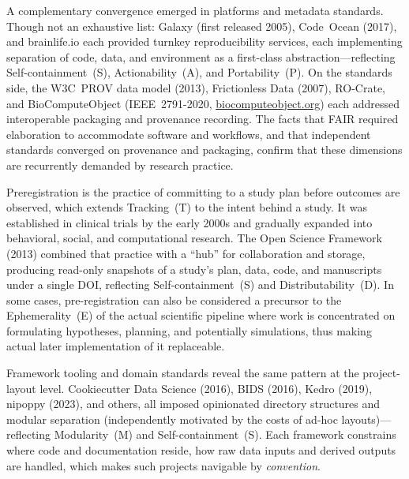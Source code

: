 \documentclass{article}
\newcommand{\httpsurl}[1]{\href{https://#1}{#1}}
\begin{document}
A complementary convergence emerged in platforms and metadata standards.
Though not an exhaustive list: Galaxy\cite{afgan_galaxy_2018} (first released 2005), Code~Ocean\cite{cheifet_promoting_2021} (2017), and brainlife.io\cite{hayashi_brainlifeio_2024} each provided turnkey reproducibility services, each implementing separation of code, data, and environment as a first-class abstraction---reflecting Self-containment~(S), Actionability~(A), and Portability~(P).
On the standards side, the W3C~PROV data model (2013), Frictionless Data\cite{fowler_frictionless_2018} (2007), RO-Crate\cite{peroni_packaging_2022}, and BioComputeObject\cite{ferrer_biocompute_2017} (IEEE~2791-2020, \httpsurl{biocomputeobject.org}) each addressed interoperable packaging and provenance recording.
The facts that FAIR required elaboration to accommodate software\cite{barker_introducing_2022} and workflows\cite{goble_fair_2020,wilkinson_applying_2025}, and that independent standards converged on provenance and packaging, confirm that these dimensions are recurrently demanded by research practice.

Preregistration is the practice of committing to a study plan before outcomes are observed, which extends Tracking~(T) to the intent behind a study.
It was established in clinical trials by the early 2000s and gradually expanded into behavioral, social, and computational research\cite{nosek_preregistration_2018}.
The Open Science Framework\cite{foster_open_2017} (2013) combined that practice with a ``hub'' for collaboration and storage, producing read-only snapshots of a study's plan, data, code, and manuscripts under a single DOI, reflecting Self-containment~(S) and Distributability~(D).
In some cases, pre-registration can also be considered a precursor to the Ephemerality~(E) of the actual scientific pipeline where work is concentrated on formulating hypotheses, planning, and potentially simulations, thus making actual later implementation of it replaceable.

Framework tooling and domain standards reveal the same pattern at the project-layout level.
Cookiecutter Data Science (2016), BIDS\cite{gorgolewski_brain_2016} (2016), Kedro (2019), nipoppy\cite{wang_open_2026} (2023), and others, all imposed opinionated directory structures and modular separation (independently motivated by the costs of ad-hoc layouts)---reflecting Modularity~(M) and Self-containment~(S).
Each framework constrains where code and documentation reside, how raw data inputs and derived outputs are handled, which makes such projects navigable by \emph{convention}.
\end{document}
